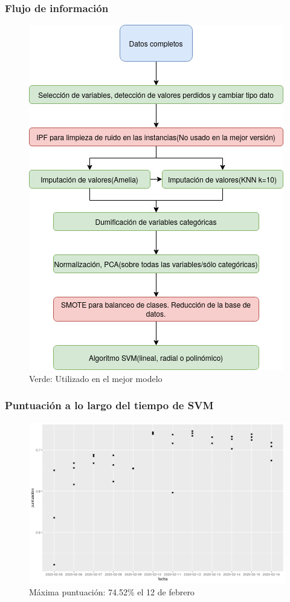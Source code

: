 \begin{frame}
\frametitle{Flujo de información}
\begin{figure}
	\centering
	\includegraphics[width=0.5\linewidth]{figures/DiagramaFlujoSVM}
	\caption{Verde: Utilizado en el mejor modelo}
	\label{fig:diagramaflujosvm}
\end{figure}


\end{frame}


\begin{frame}
\frametitle{Puntuación a lo largo del tiempo de SVM}

\begin{figure}
	\centering
	\includegraphics[width=\linewidth]{figures/puntuacionSVM}
	\caption{Máxima puntuación: 74.52\% el 12 de febrero}
	\label{fig:puntuacionsvm}
\end{figure}


\end{frame}